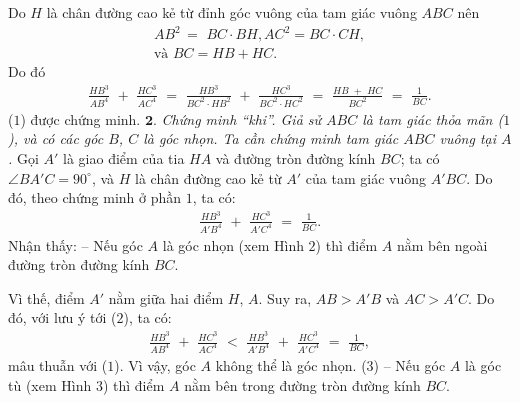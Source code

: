 \begin{multicols}{2}
	Do $H$ là chân đường cao kẻ từ đỉnh góc vuông của tam giác vuông $ABC$ nên
	\begin{align*}
		A{B^2}\, = \,\,BC \cdot BH, AC^2 = BC \cdot CH,\\
		\text{và }	BC = HB + HC.
	\end{align*}
	Do đó
	\begin{align*}
		\frac{{H{B^3}}}{{A{B^4}}}\,\, + \,\,\frac{{H{C^3}}}{{A{C^4}}}\,\, = \,\,\frac{{H{B^3}}}{{B{C^2} \cdot H{B^2}}}\,\, + \,\,\frac{{H{C^3}}}{{B{C^2} \cdot H{C^2}}}\,\, = \,\,\frac{{HB\,\, + \,\,HC}}{{B{C^2}}}\,\, = \,\,\frac{1}{{BC}}.
	\end{align*}
	($1$) được chứng minh.
	\vskip 0.05cm
	$\pmb{2.}$ \textit{Chứng minh “khi”.
	Giả sử $ABC$ là tam giác thỏa mãn ($1$), và có các góc $B$, $C$ là góc nhọn. 
	Ta cần chứng minh tam giác $ABC$ vuông tại $A$.}
	Gọi $A'$ là giao điểm của tia $HA$ và đường tròn đường kính $BC$; ta có $\angle BA'C = 90^\circ$,  và $H$ là chân đường cao kẻ từ $A'$  của tam giác vuông $A'BC$. Do đó, theo chứng minh ở phần $1$, ta có:
	\begin{align*}
		\frac{{H{B^3}}}{{A'{B^4}}}\,\, + \,\,\frac{{H{C^3}}}{{A'{C^4}}}\,\, = \,\,\frac{1}{{BC}}. \tag{$2$}	
	\end{align*}
	Nhận thấy:
	\vskip 0.05cm
	-- Nếu góc $A$ là góc nhọn (xem Hình $2$) thì điểm $A$ nằm bên ngoài đường tròn đường kính $BC$.
	
	Vì thế, điểm $A'$ nằm giữa hai điểm $H$, $A$. Suy ra, $AB > A'B$  và $AC > A'C$.  Do đó, với lưu ý tới ($2$), ta có:
	\begin{align*}
		\frac{{H{B^3}}}{{A{B^4}}}\,\, + \,\,\frac{{H{C^3}}}{{A{C^4}}}\,\, < \,\,\frac{{H{B^3}}}{{A'{B^4}}}\,\, + \,\,\frac{{H{C^3}}}{{A'{C^4}}}\,\, = \,\,\frac{1}{{BC}},
	\end{align*}
	mâu thuẫn với ($1$). Vì vậy, góc $A$ không thể là góc nhọn.                     \hfill ($3$)
	\vskip 0.05cm
	-- Nếu góc $A$ là góc tù (xem Hình $3$) thì điểm $A$ nằm bên trong đường tròn đường kính $BC$.
	

\end{multicols}
